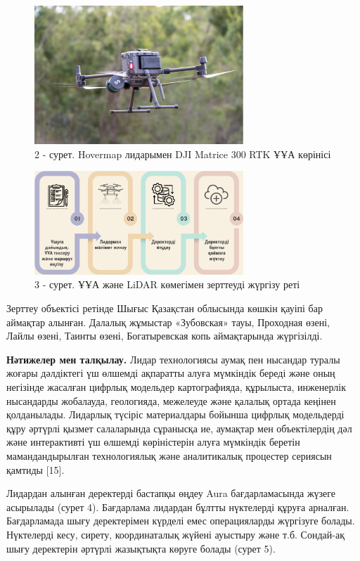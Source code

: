 \begin{figure}[H]
	\centering
	\includegraphics[width=0.7\textwidth]{media/ict2/image200}
	\caption*{2 - сурет. Hovermap лидарымен DJI Matrice 300 RTK ҰҰА көрінісі}
\end{figure}

\begin{figure}[H]
	\centering
	\includegraphics[width=0.7\textwidth]{media/ict2/image201}
	\caption*{3 - сурет. ҰҰА және LiDAR көмегімен зерттеуді жүргізу реті}
\end{figure}

\begin{multicols}{2}
Зерттеу объектісі ретінде Шығыс Қазақстан облысында көшкін қауіпі бар
аймақтар алынған. Далалық жұмыстар «Зубовская» тауы, Проходная өзені,
Лайлы өзені, Таинты өзені, Богатыревская копь аймақтарында жүргізілді.

{\bfseries Нәтижелер мен талқылау.} Лидар технологиясы аумақ пен нысандар
туралы жоғары дәлдіктегі үш өлшемді ақпаратты алуға мүмкіндік береді
және оның негізінде жасалған цифрлық модельдер картографияда, құрылыста,
инженерлік нысандарды жобалауда, геологияда, межелеуде және қалалық
ортада кеңінен қолданылады. Лидарлық түсіріс материалдары бойынша
цифрлық модельдерді құру әртүрлі қызмет салаларында сұранысқа ие,
аумақтар мен объектілердің дәл және интерактивті үш өлшемді көріністерін
алуға мүмкіндік беретін мамандандырылған технологиялық және аналитикалық
процестер сериясын қамтиды {[}15{]}.

Лидардан алынған деректерді бастапқы өңдеу Aura бағдарламасында жүзеге
асырылады (сурет 4). Бағдарлама лидардан бұлтты нүктелерді құруға
арналған. Бағдарламада шығу деректерімен күрделі емес операцияларды
жүргізуге болады. Нүктелерді кесу, сирету, координаталық жүйені ауыстыру
және т.б. Сондай-ақ шығу деректерін әртүрлі жазықтықта көруге болады
(сурет 5).
\end{multicols}

